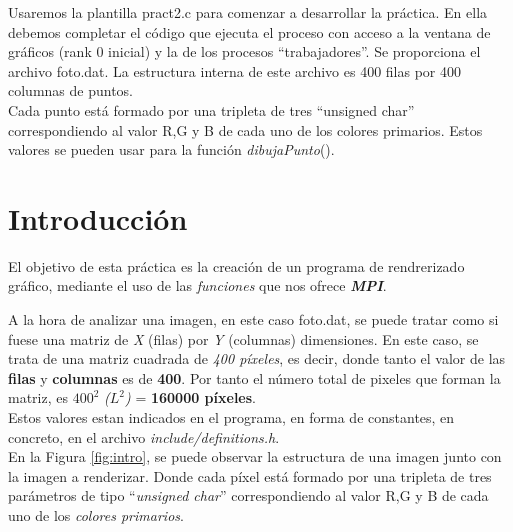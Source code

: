 \documentclass[11pt]{article}
\begin{document}
Usaremos la plantilla pract2.c para comenzar a desarrollar la práctica.
En ella debemos completar el código que ejecuta el proceso con acceso a la
ventana de gráficos (rank 0 inicial) y la de los procesos “trabajadores”.
Se proporciona el archivo foto.dat. La estructura interna de este archivo
es 400 filas por 400 columnas de puntos.\\
Cada punto está formado por una
tripleta de tres “unsigned char” correspondiendo al valor R,G y B de cada uno
de los colores primarios. Estos valores se pueden usar para la función
\textit{dibujaPunto}().

\newpage
\section{Introducción}
El objetivo de esta práctica es la creación de un programa de rendrerizado gráfico, mediante el uso de las \textit{funciones} que nos ofrece \textbf{\textit{MPI}}.

A la hora de analizar una imagen, en este caso foto.dat, se puede tratar como si fuese una matriz de \textit{X} (filas) por \textit{Y} (columnas) dimensiones. En este caso, se trata de una matriz cuadrada de \textit{400 píxeles}, es decir, donde tanto el valor de las \textbf{filas} y \textbf{columnas} es de \textbf{400}. Por tanto el número total de pixeles que forman la matriz, es \textbf{$400^2$} \textit{($L^2$)} = \textbf{160000 píxeles}.\\
Estos valores estan indicados en el programa, en forma de constantes, en concreto, en el archivo \textit{include/definitions.h}.\\

En la Figura \ref{fig:intro}, se puede observar la estructura de una imagen junto con la imagen a renderizar. Donde cada píxel está formado por una
tripleta de tres parámetros de tipo “\textit{unsigned char}” correspondiendo al valor R,G y B de cada uno de los \textit{colores primarios}.
\end{document}

